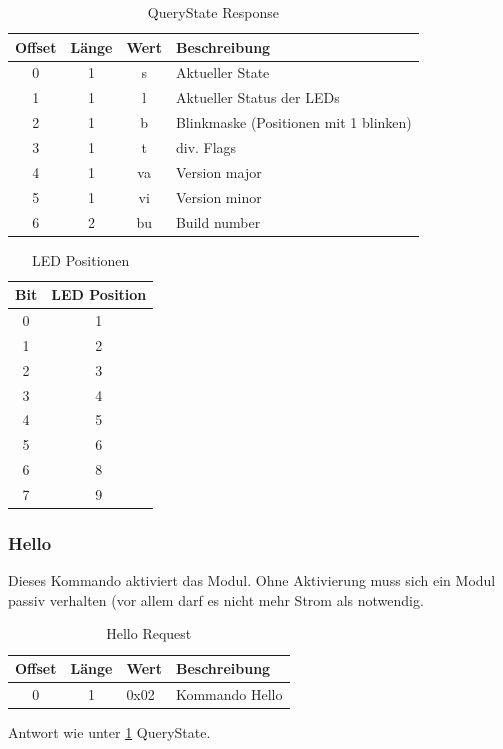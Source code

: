 \documentclass[10pt,a4paper]{article}
\begin{document}
\begin{table}[H]
\label{QUERYSTATE_RESP}
\centering
\begin{tabular}{c|c|c|l}
\textbf{Offset} & \textbf{Länge} & \textbf{Wert} & \textbf{Beschreibung} \\ \hline
0 & 1 & s & Aktueller State\\
1 & 1 & l & Aktueller Status der LEDs\\
2 & 1 & b & Blinkmaske (Positionen mit 1 blinken)\\
3 & 1 & t & div. Flags\\
4 & 1 & va & Version major\\
5 & 1 & vi & Version minor\\
6 & 2 & bu & Build number
\end{tabular}
\caption{QueryState Response}
\end{table}

\begin{table}[H]
\centering
\begin{tabular}{c|c}
\label{POSMASK}
\textbf{Bit} & \textbf{LED Position} \\ \hline
0 & 1 \\
1 & 2 \\
2 & 3 \\
3 & 4 \\
4 & 5 \\
5 & 6 \\
6 & 8 \\
7 & 9
\end{tabular}
\caption{LED Positionen}
\end{table}


\subsubsection{Hello}
\label{sec:Hello}
Dieses Kommando aktiviert das Modul. Ohne Aktivierung muss sich ein Modul passiv verhalten (vor allem darf es nicht mehr Strom als notwendig.
\begin{table}[H]
\centering
\begin{tabular}{c|c|l|l}
\textbf{Offset} & \textbf{Länge} & \textbf{Wert} & \textbf{Beschreibung} \\ \hline
0 & 1 & 0x02 & Kommando Hello 
\end{tabular}
\caption{Hello Request}
\end{table}
Antwort wie unter \ref{QUERYSTATE_RESP} QueryState.
\end{document}
